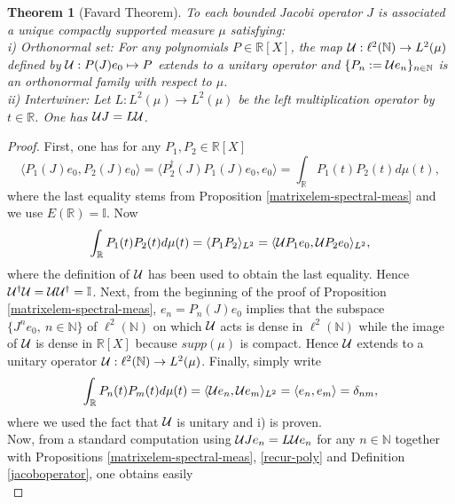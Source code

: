 \documentclass[a4paper,11pt,twoside]{article}
\numberwithin{equation}{section}
\newcommand\bbone{{ \mathbb{I}}}
\newtheorem{theorem}[Theorem]{Theorem}
\theoremstyle{nonumberplain}
\newtheorem{proof}{Proof}
\newcounter{and}
\begin{document}
\begin{theorem} [Favard Theorem]\label{Favard}
To each bounded Jacobi operator $J$ is associated a unique compactly supported measure $\mu$ satisfying:\\
i) Orthonormal set:  For any polynomials $P\in\mathbb{R}[X]$, the map ${\cal{U}}:\ell^2(\mathbb{N})\to L^2(\mu)$ defined by ${\cal{U}}:P(J)e_0\mapsto P$ extends to a unitary operator and $\{P_n:={\cal{U}}e_n\}_{n\in\mathbb{N}}$ is an orthonormal family with respect to $\mu$.\\
ii) Intertwiner: Let $L:L^2(\mu)\to L^2(\mu)$ be the left multiplication operator by $t\in\mathbb{R}$. One has ${\cal{U}}J=L\cal{U}$.
\end{theorem}
\begin{proof}
First, one has for any $P_1, P_2\in\mathbb{R}[X]$ 
\begin{equation}
\langle P_1(J)e_0, P_2(J)e_0\rangle=\langle P_2^\dag(J)P_1(J)e_0, e_0\rangle=\int_\mathbb{R}P_1(t)P_2(t)d\mu(t),
\end{equation}
where the last equality stems from Proposition \ref{matrixelem-spectral-meas} and we use $E(\mathbb{R})=\bbone$. Now 
\begin{equation}
\int_\mathbb{R}P_1(t)P_2(t)d\mu(t)=\langle P_1P_2\rangle_{L^2}= \langle {\cal{U}}P_1e_0,{\cal{U}}P_2e_0\rangle_{L^2},
\end{equation}
where the definition of ${\cal{U}}$ has been used to obtain the last equality. Hence ${\cal{U}}^\dag{\cal{U}}={\cal{U}}{\cal{U}}^\dag=\bbone$. Next, from the beginning of the proof of Proposition \ref{matrixelem-spectral-meas}, $e_n=P_n(J)e_0$ implies that the subspace $\{J^ne_0,\ n\in\mathbb{N}\}$ of $\ell^2(\mathbb{N})$ on which ${\cal{U}}$ acts is dense in $\ell^2(\mathbb{N})$ while the image of ${\cal{U}}$ is dense in $\mathbb{R}[X]$ because $supp(\mu)$ is compact. Hence ${\cal{U}}$ extends to a unitary operator ${\cal{U}}:\ell^2(\mathbb{N})\to L^2(\mu)$. Finally, simply write 
\begin{equation}
\int_\mathbb{R}P_n(t)P_m(t)d\mu(t)=\langle {\cal{U}}e_n,{\cal{U}}e_m\rangle_{L^2}=\langle e_n,e_m\rangle=\delta_{nm},
\end{equation}
where we used the fact that ${\cal{U}}$ is unitary and i) is proven. \\
Now, from a standard computation using ${\cal{U}}Je_n=L{\cal{U}}e_n$ for any $n\in\mathbb{N}$ together with Propositions \ref{matrixelem-spectral-meas}, \ref{recur-poly} and Definition \ref{jacoboperator}, one obtains easily 
\begin{equation}

\end{equation}
\end{proof}
\end{document}
